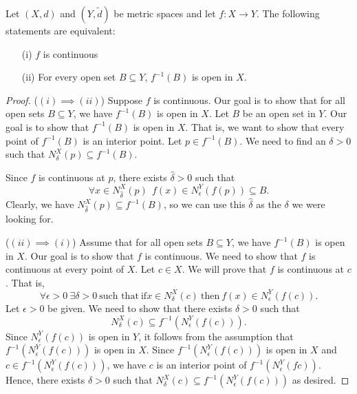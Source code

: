 \documentclass[a4paper]{article}
\begin{document}
\begin{theorem}
    Let \( (X,d) \) and \( (Y,\tilde{d}) \) be metric spaces and let \( f: X \to Y \). The following statements are equivalent:  
    \begin{enumerate}
        \item[(i)] \( f  \) is continuous
        \item[(ii)] For every open set \( B \subseteq  Y  \), \( f^{-1}(B) \) is open in \( X  \).
    \end{enumerate}
\end{theorem}
\begin{proof}
    (\( (i) \implies (ii) \)) Suppose \( f  \) is continuous. Our goal is to show that for all open sets \( B \subseteq  Y  \), we have \( f^{-1}(B) \) is open in \( X  \). Let \( B  \) be an open set in \( Y  \). Our goal is to show that \( f^{-1}(B) \) is open in \( X  \). That is, we want to show that every point of \( f^{-1}(B) \) is an interior point. Let \( p \in f^{-1}(B) \). We need to find an \( \delta > 0  \) such that \( {N}_{\delta}^{X}(p) \subseteq  f^{-1}(B) \). 

    Since \( f  \) is continuous at \( p  \), there exists \( \hat{\delta} > 0  \) such that 
    \[  \forall x \in {N}_{\hat{\delta}}^{X}(p) \ \ f(x) \in {N}_{\epsilon}^{Y}(f(p)) \subseteq  B.  \]
    Clearly, we have \( {N}_{\hat{\delta}}^{X}(p) \subseteq  f^{-1}(B) \), so we can use this \( \hat{\delta} \) as the \( \delta  \) we were looking for.

    (\( (ii) \implies (i) \)) Assume that for all open sets \( B  \subseteq Y \), we have \( f^{-1}(B) \) is open in \( X  \). Our goal is to show that \( f  \) is continuous. We need to show that \( f  \) is continuous at every point of \( X  \). Let \( c \in X  \). We will prove that \( f  \) is continuous at \( c  \). That is, 
    \[  \forall \epsilon > 0 \ \exists \delta > 0 \ \text{such that} \ \text{if} x \in {N}_{\delta}^{X}(c) \ \text{then} \ f(x) \in {N}_{\epsilon}^{Y}(f(c)). \]
    Let \( \epsilon > 0  \) be given. We need to show that there exists \( \delta > 0  \) such that  
    \[  {N}_{\delta}^{X}(c) \subseteq f^{-1}({N}_{\epsilon}^{Y}(f(c))). \tag{*} \]
    Since \( {N}_{\epsilon}^{Y}(f(c))  \) is open in \( Y \), it follows from the assumption that \( f^{-1}({N}_{\epsilon}^{Y}(f(c))) \) is open in \( X  \). Since \( f^{-1}({N}_{\epsilon}^{Y}(f(c))) \) is open in \( X  \) and \( c \in f^{-1}({N}_{\epsilon}^{Y}(f(c)))  \), we have \( c  \) is an interior point of \( f^{-1}({N}_{\epsilon}^{Y}(fc)) \). Hence, there exists \( \delta > 0  \) such that \( {N}_{\delta}^{X}(c) \subseteq f^{-1}({N}_{\epsilon}^{Y}(f(c))) \) as desired.
\end{proof} 
\end{document}
